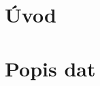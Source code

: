 \documentclass[a4paper]{ article}
\begin{document}



\titulniStrana
\generujObsah			%
\generujSeznamObrazku		%
\generujSeznamTabulek		%



\clearpage
\pagestyle{plain}		%
 {}
\section*{Úvod}
\label{uvod}





\section{Popis dat}

\end{document}
